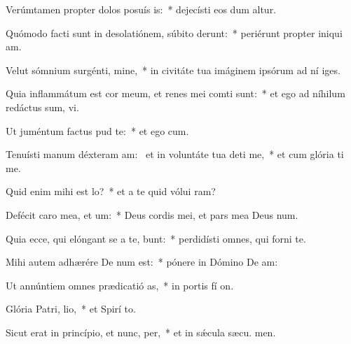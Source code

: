 \item Verúmtamen propter dolos posuís is:~* dejecísti eos dum altur.
\item Quómodo facti sunt in desolatiónem, súbito derunt:~* periérunt propter iniqui am.
\item Velut sómnium surgénti, mine,~* in civitáte tua imáginem ipsórum ad ní iges.
\item Quia inflammátum est cor meum, et renes mei comti sunt:~* et ego ad níhilum redáctus sum,  vi.
\item Ut juméntum factus  pud te:~* et ego  cum.
\item Tenuísti manum déxteram am:~\pscross{} et in voluntáte tua deti me,~* et cum glória ti me.
\item Quid enim mihi est  lo?~* et a te quid vólui  ram?
\item Defécit caro mea, et  um:~* Deus cordis mei, et pars mea Deus  num.
\item Quia ecce, qui elóngant se a te, bunt:~* perdidísti omnes, qui forni  te.
\item Mihi autem adhærére De num est:~* pónere in Dómino De  am:
\item Ut annúntiem omnes prædicatió as,~* in portis fí on.
\item Glória Patri,  lio,~* et Spirí to.
\item Sicut erat in princípio, et nunc,  per,~* et in sǽcula sæcu. men.
